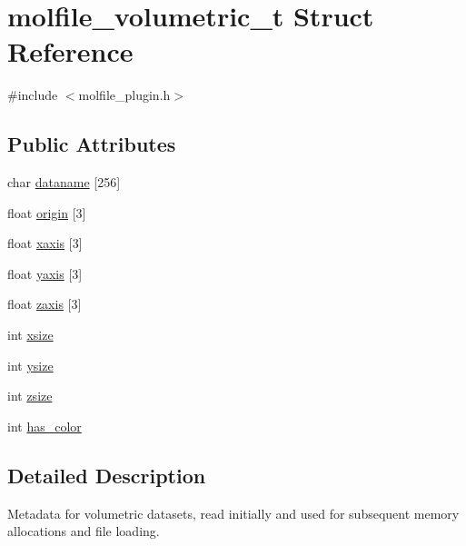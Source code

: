 \hypertarget{structmolfile__volumetric__t}{\section{molfile\-\_\-volumetric\-\_\-t \-Struct \-Reference}
\label{structmolfile__volumetric__t}
}


{\ttfamily \#include $<$molfile\-\_\-plugin.\-h$>$}

\subsection*{\-Public \-Attributes}
\begin{DoxyCompactItemize}
\item 
char \hyperlink{structmolfile__volumetric__t_aa4bfbb00758b1ed2f76504c90444e8ef}{dataname} \mbox{[}256\mbox{]}
\item 
float \hyperlink{structmolfile__volumetric__t_a1801318b10612f857e838b32f706fbcc}{origin} \mbox{[}3\mbox{]}
\item 
float \hyperlink{structmolfile__volumetric__t_aa55eac0680e84bc17e7ae7c68999d834}{xaxis} \mbox{[}3\mbox{]}
\item 
float \hyperlink{structmolfile__volumetric__t_a7894460a7b7ab25a63d2136cbe5f487d}{yaxis} \mbox{[}3\mbox{]}
\item 
float \hyperlink{structmolfile__volumetric__t_a96986b72e7001fc709553c7f866fa56b}{zaxis} \mbox{[}3\mbox{]}
\item 
int \hyperlink{structmolfile__volumetric__t_a249ff6b46477c2ec63f49bad8238a112}{xsize}
\item 
int \hyperlink{structmolfile__volumetric__t_a81703da41da3cf91faf8d433d685f334}{ysize}
\item 
int \hyperlink{structmolfile__volumetric__t_a31f1f776b5cf3f01f3658a6aecbeb7ce}{zsize}
\item 
int \hyperlink{structmolfile__volumetric__t_ab8e2959cd215b5a0d899c4282f32697f}{has\-\_\-color}
\end{DoxyCompactItemize}


\subsection{\-Detailed \-Description}
\-Metadata for volumetric datasets, read initially and used for subsequent memory allocations and file loading. 

